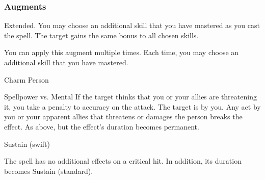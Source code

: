 \subsubsection{Augments}
 Extended.
You may choose an additional skill that you have mastered as you cast the spell.
The target gains the same bonus to all chosen skills.
\par You can apply this augment multiple times.
Each time, you may choose an additional skill that you have mastered.
\begin{spellsection}{Charm Person}
\begin{spellheader}
\end{spellheader}
\begin{spellcontent}
\begin{spelltargetinginfo}
\end{spelltargetinginfo}
\begin{spelleffects}
\begin{spellattack}{Spellpower vs. Mental}
\spellspecial If the target thinks that you or your allies are threatening it, you take a  penalty to accuracy on the attack.
\spellsuccess
The target is \charmed by you.
Any act by you or your apparent allies that threatens or damages the  person breaks the effect.
\spellcritical As above, but the effect's duration becomes permanent.
\end{spellattack}
\spelldur Sustain (swift)
\end{spelleffects}
\end{spellcontent}
\begin{spellfooter}
\miscastexplode
\end{spellfooter}
\begin{spellcantrip}
The spell has no additional effects on a critical hit.
In addition, its duration becomes Sustain (standard).
\end{spellcantrip}
\end{spellsection}
